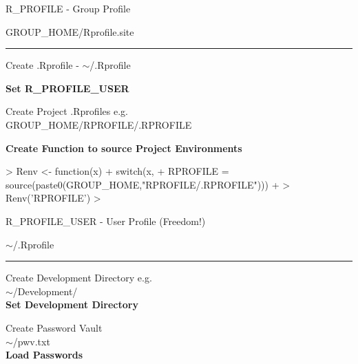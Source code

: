 \documentclass{beamer}
\begin{document}
\begin{frame}{R\_PROFILE - Group Profile}

\begin{center} GROUP\_HOME/Rprofile.site\\ \end{center}
\begin{center}
\rule{4cm}{0.6pt}
\end{center}

\begin{center}Create .Rprofile - $\sim$/.Rprofile\\\end{center}
\textbf{Set R\_PROFILE\_USER\\}

\begin{center}
 Create Project .Rprofiles e.g.\\ GROUP\_HOME/RPROFILE/.RPROFILE
\end{center}

\textbf{Create Function to source Project Environments \\}
\end{frame}

\begin{Schunk}
\begin{Sinput}
> Renv <- function(x){
+  switch(x,
+        RPROFILE = source(paste0(GROUP_HOME,"RPROFILE/.RPROFILE")))
+ }
> Renv('RPROFILE') 
>  
\end{Sinput}
\end{Schunk}


\begin{frame}{R\_PROFILE\_USER - User Profile {\color{green} (Freedom!)}}

\begin{center} $\sim$/.Rprofile\\ \end{center}
\begin{center}
\rule{4cm}{0.6pt}
\end{center}

\bigskip

\begin{center}
Create Development Directory e.g.\\ $\sim$/Development/ \\ 
\textbf{Set Development Directory}
\end{center}

\begin{center}
Create Password Vault \\ $\sim$/pwv.txt \\ 
\textbf{Load Passwords}\\
\end{center}

\end{frame}
\end{document}
